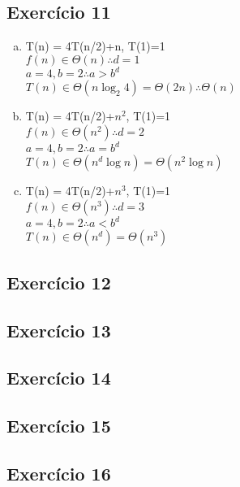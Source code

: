 \subsection{Exercício 11}\label{sec:exer11}

\begin{enumerate}[a)]
  \item T(n) = 4T(n/2)+n, T(1)=1 \\
  $f(n) \in \Theta(n) \therefore d=1$ \\
  $a = 4, b = 2 \therefore a>b^{d}$ \\
  $T(n) \in \Theta(n\log_{2}4) = \Theta(2n) \therefore \Theta(n)$
  \item T(n) = 4T(n/2)+$n^{2}$, T(1)=1 \\
  $f(n) \in \Theta(n^{2}) \therefore d=2$ \\
  $a = 4, b = 2 \therefore a=b^{d}$ \\
  $T(n) \in \Theta(n^{d} \log{}n) = \Theta(n^{2} \log{}n)$
  \item T(n) = 4T(n/2)+$n^{3}$, T(1)=1 \\
  $f(n) \in \Theta(n^{3}) \therefore d=3$ \\
  $a = 4, b = 2 \therefore a<b^{d}$ \\
  $T(n) \in \Theta(n^{d}) = \Theta(n^{3})$
\end{enumerate}

\subsection{Exercício 12}\label{sec:exer12}

\subsection{Exercício 13}\label{sec:exer13}

\subsection{Exercício 14}\label{sec:exer14}

\subsection{Exercício 15}\label{sec:exer15}

\subsection{Exercício 16}\label{sec:exer16}
